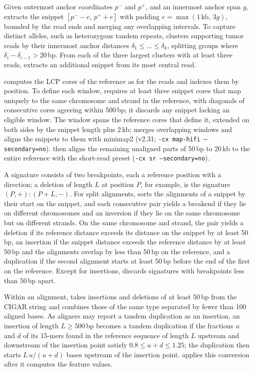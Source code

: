 
Given outermost anchor coordinates $p^-$ and $p^+$, and an innermost anchor span $g$, \tool{} extracts the snippet $[p^- - e,\, p^+ + e]$ with padding $e=\max(1\,\text{kb},\,3g)$, bounded by the read ends and merging any overlapping intervals.
To capture distinct alleles, such as heterozygous tandem repeats, \tool{} clusters supporting tumor reads by their innermost anchor distances $\delta_1 \le \dots \le \delta_k$, splitting groups where $\delta_i - \delta_{i-1} > 20$\,bp.
From each of the three largest clusters with at least three reads, \tool{} extracts an additional snippet from its most central read.

\tool{} computes the LCP cores of the reference as for the reads and indexes them by position.
To define each window, \tool{} requires at least three snippet cores that map uniquely to the same chromosome and strand in the reference, with diagonals of consecutive cores agreeing within 500\,bp; it discards any snippet lacking an eligible window.
The window spans the reference cores that define it, extended on both sides by the snippet length plus 2\,kb; \tool{} merges overlapping windows and aligns the snippets to them with minimap2 (v2.31; \texttt{-cx map-hifi --secondary=no}).
\tool{} then aligns the remaining unaligned parts of 50\,bp to 20\,kb to the entire reference with the short-read preset (\texttt{-cx sr --secondary=no}).


A signature consists of two breakpoints, each a reference position with a direction; a deletion of length $L$ at position $P$, for example, is the signature $(P,+)\!:\!(P+L,-)$.
For split alignments, \tool{} sorts the alignments of a snippet by their start on the snippet, and each consecutive pair yields a breakend if they lie on different chromosomes and an inversion if they lie on the same chromosome but on different strands.
On the same chromosome and strand, the pair yields a deletion if its reference distance exceeds its distance on the snippet by at least 50\,bp, an insertion if the snippet distance exceeds the reference distance by at least 50\,bp and the alignments overlap by less than 50\,bp on the reference, and a duplication if the second alignment starts at least 50\,bp before the end of the first on the reference.
Except for insertions, \tool{} discards signatures with breakpoints less than 50\,bp apart.

Within an alignment, \tool{} takes insertions and deletions of at least 50\,bp from the CIGAR string and combines those of the same type separated by fewer than 100 aligned bases.
As aligners may report a tandem duplication as an insertion, an insertion of length $L\geq 500$\,bp becomes a tandem duplication if the fractions $u$ and $d$ of its 15-mers found in the reference sequence of length $L$ upstream and downstream of the insertion point satisfy $0.8\leq u+d\leq 1.25$; the duplication then starts $L\,u/(u+d)$ bases upstream of the insertion point.
\tool{} applies this conversion after it computes the feature values.

